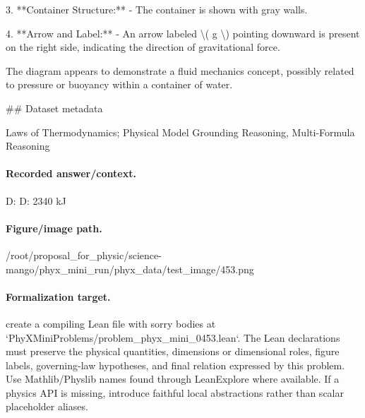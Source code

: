 3. **Container Structure:**
   - The container is shown with gray walls.

4. **Arrow and Label:**
   - An arrow labeled \textbackslash{}( g \textbackslash{}) pointing downward is present on the right side, indicating the direction of gravitational force.

The diagram appears to demonstrate a fluid mechanics concept, possibly related to pressure or buoyancy within a container of water.

\#\# Dataset metadata

Laws of Thermodynamics; Physical Model Grounding Reasoning, Multi-Formula Reasoning

\paragraph{Recorded answer/context.}
D: D: 2340 kJ

\paragraph{Figure/image path.}
/root/proposal\_for\_physic/science-mango/phyx\_mini\_run/phyx\_data/test\_image/453.png

\paragraph{Formalization target.}
create a compiling Lean file with sorry bodies at `PhyXMiniProblems/problem\_phyx\_mini\_0453.lean`. The Lean declarations must preserve the physical quantities, dimensions or dimensional roles, figure labels, governing-law hypotheses, and final relation expressed by this problem.
Use Mathlib/Physlib names found through LeanExplore where available. If a physics API is missing, introduce faithful local abstractions rather than scalar placeholder aliases.

